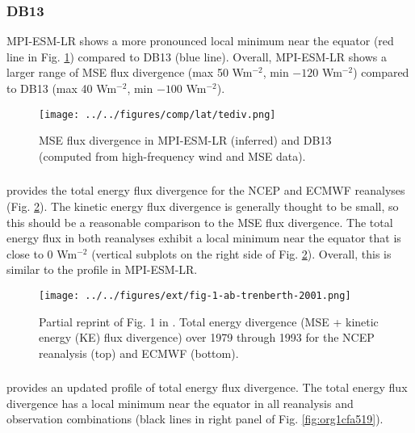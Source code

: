 \documentclass[11pt]{article}
\begin{document}
\subsubsection{DB13}
\label{sec:org9386ade}
MPI-ESM-LR shows a more pronounced local minimum near the equator (red line in Fig. \ref{fig:org39dc232}) compared to DB13 (blue line). Overall, MPI-ESM-LR shows a larger range of MSE flux divergence (max 50 Wm\(^{-2}\), min \(-120\) Wm\(^{-2}\)) compared to DB13 (max 40 Wm\(^{-2}\), min \(-100\) Wm\(^{-2}\)).

\begin{figure}[htbp]
\centering
\texttt{[image: ../../figures/comp/lat/tediv.png]}
\caption{\label{fig:org39dc232}MSE flux divergence in MPI-ESM-LR (inferred) and DB13 (computed from high-frequency wind and MSE data).}
\end{figure}

\subsubsection{\cite{trenberth_atmospheric_2001}}
\label{sec:orgfd7cab0}
\cite{trenberth_atmospheric_2001} provides the total energy flux divergence for the NCEP and ECMWF reanalyses (Fig. \ref{fig:orgf2b3688}). The kinetic energy flux divergence is generally thought to be small, so this should be a reasonable comparison to the MSE flux divergence. The total energy flux in both reanalyses exhibit a local minimum near the equator that is close to 0 Wm\(^{-2}\) (vertical subplots on the right side of Fig. \ref{fig:orgf2b3688}). Overall, this is similar to the profile in MPI-ESM-LR.

\begin{figure}[htbp]
\centering
\texttt{[image: ../../figures/ext/fig-1-ab-trenberth-2001.png]}
\caption{\label{fig:orgf2b3688}Partial reprint of Fig. 1 in \cite{trenberth_atmospheric_2001}. Total energy divergence (MSE + kinetic energy (KE) flux divergence) over 1979 through 1993 for the NCEP reanalysis (top) and ECMWF (bottom).}
\end{figure}

\subsubsection{\cite{fasullo_annual_2008-1}}
\label{sec:org358b4c0}
\cite{fasullo_annual_2008-1} provides an updated profile of total energy flux divergence. The total energy flux divergence has a local minimum near the equator in all reanalysis and observation combinations (black lines in right panel of Fig. \ref{fig:org1cfa519}).
\end{document}
